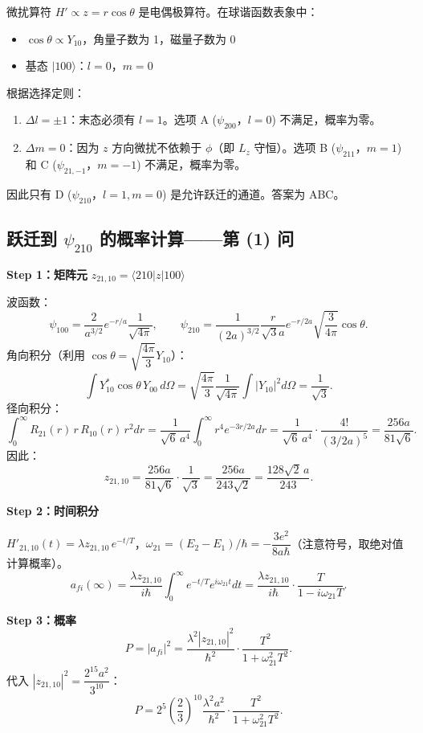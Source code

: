 \begin{derivationbox}[选择定则分析]
微扰算符 $H' \propto z = r\cos\theta$ 是电偶极算符。在球谐函数表象中：
\begin{itemize}
\item $\cos\theta \propto Y_{10}$，角量子数为 1，磁量子数为 0
\item 基态 $|100\rangle$：$l=0$，$m=0$
\end{itemize}
根据选择定则：
\begin{enumerate}
\item $\Delta l = \pm 1$：末态必须有 $l=1$。选项 A ($\psi_{200}$，$l=0$) 不满足，概率为零。
\item $\Delta m = 0$：因为 $z$ 方向微扰不依赖于 $\phi$（即 $L_z$ 守恒）。选项 B ($\psi_{211}$，$m=1$) 和 C ($\psi_{21,-1}$，$m=-1$) 不满足，概率为零。
\end{enumerate}
因此只有 D ($\psi_{210}$，$l=1, m=0$) 是允许跃迁的通道。答案为 ABC。
\end{derivationbox}

\subsection{跃迁到 $\psi_{210}$ 的概率计算——第 (1) 问}

\begin{derivationbox}[跃迁概率计算]
\textbf{Step 1：矩阵元} $z_{21,10} = \langle 210|z|100\rangle$

波函数：
\[
\psi_{100} = \frac{2}{a^{3/2}} e^{-r/a} \frac{1}{\sqrt{4\pi}}, \qquad
\psi_{210} = \frac{1}{(2a)^{3/2}} \frac{r}{\sqrt{3}a} e^{-r/2a} \sqrt{\frac{3}{4\pi}} \cos\theta.
\]
角向积分（利用 $\cos\theta = \sqrt{\dfrac{4\pi}{3}} Y_{10}$）：
\[
\int Y_{10}^* \cos\theta \, Y_{00} \, d\Omega = \sqrt{\frac{4\pi}{3}} \frac{1}{\sqrt{4\pi}} \int |Y_{10}|^2 d\Omega = \frac{1}{\sqrt{3}}.
\]
径向积分：
\[
\int_0^\infty R_{21}(r)\, r\, R_{10}(r)\, r^2 dr = \frac{1}{\sqrt{6}\,a^4} \int_0^\infty r^4 e^{-3r/2a} dr = \frac{1}{\sqrt{6}\,a^4} \cdot \frac{4!}{(3/2a)^5} = \frac{256a}{81\sqrt{6}}.
\]
因此：
\[
z_{21,10} = \frac{256a}{81\sqrt{6}} \cdot \frac{1}{\sqrt{3}} = \frac{256a}{243\sqrt{2}} = \frac{128\sqrt{2}\,a}{243}.
\]

\textbf{Step 2：时间积分}

$H'_{21,10}(t) = \lambda z_{21,10}\, e^{-t/T}$，$\omega_{21} = (E_2 - E_1)/\hbar = -\dfrac{3e^2}{8a\hbar}$（注意符号，取绝对值计算概率）。
\[
a_{fi}(\infty) = \frac{\lambda z_{21,10}}{i\hbar} \int_0^\infty e^{-t/T} e^{i\omega_{21}t} dt = \frac{\lambda z_{21,10}}{i\hbar} \cdot \frac{T}{1 - i\omega_{21}T}.
\]

\textbf{Step 3：概率}
\[
P = |a_{fi}|^2 = \frac{\lambda^2 |z_{21,10}|^2}{\hbar^2} \cdot \frac{T^2}{1 + \omega_{21}^2 T^2}.
\]
代入 $|z_{21,10}|^2 = \dfrac{2^{15} a^2}{3^{10}}$：
\[
P = 2^5 \left(\frac{2}{3}\right)^{10} \frac{\lambda^2 a^2}{\hbar^2} \cdot \frac{T^2}{1 + \omega_{21}^2 T^2}.
\]
\end{derivationbox}

